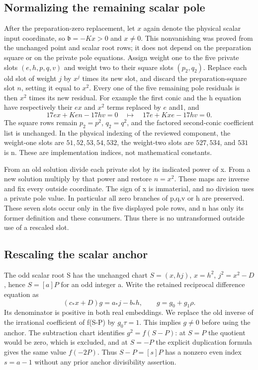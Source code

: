 \subsection{Normalizing the remaining scalar pole}
After the preparation-zero replacement, let $x$ again denote the
physical scalar input coordinate, so $\mathfrak b=-Kx>0$ and $x\ne0$.
This nonvanishing was proved from the unchanged point and scalar root
rows; it does not depend on the preparation square or on the private
pole equations. Assign weight one to the five private slots
$(e,h,p,q,v)$ and weight two to their square slots $(p_2,q_2)$.
Replace each old slot of weight $j$ by $x^j$ times its new slot,
and discard the preparation-square slot $n$, setting it equal to $x^2$.
Every one of the five remaining pole residuals is then $x^2$ times
its new residual. For example the first conic and the h equation have
respectively their $ex$ and $x^2$ terms replaced by $e$ and1, and
\[
 17ex+Ken-17hv=0
       \quad\longmapsto\quad 17e+Kxe-17hv=0.
\]
The square rows remain $p_2=p^2$, $q_2=q^2$, and the factored
second-conic coefficient list is unchanged. In the physical indexing
of the reviewed component, the weight-one slots are
$51,52,53,54,532$, the weight-two slots are $527,534$, and $531$ is n.
These are implementation indices, not mathematical constants.

From an old solution divide each private slot by its indicated power
of x. From a new solution multiply by that power and restore $n=x^2$.
These maps are inverse and fix every outside coordinate. The sign of x
is immaterial, and no division uses a private pole value. In particular
all zero branches of p,q,v or h are preserved. These seven slots occur only in the five displayed pole rows, and n
has only its former definition and these consumers. Thus there is no
untransformed outside use of a rescaled slot.

\subsection{Rescaling the scalar anchor}
The odd scalar root S has the unchanged chart
$S=(x,hj)$, $x=h^2$, $j^2=x^2-D$, hence $S=[a]P$ for an odd integer a.
Write the retained reciprocal difference equation as
\[
 (c_*x+D)g=a_*j-b_*h,\qquad g=g_0+g_1\rho.
\]
Its denominator is positive in both real embeddings. We replace the
old inverse of the irrational coefficient of f(S-P) by
$g_0\tau=1$. This implies $g\ne0$ before using the anchor.
The subtraction chart identifies $g^2=f(S-P)$: at $S=P$ the quotient
would be zero, which is excluded, and at $S=-P$ the explicit duplication
formula gives the same value $f(-2P)$. Thus $S-P=[s]P$ has a nonzero
even index $s=a-1$ without any prior anchor divisibility assertion.

